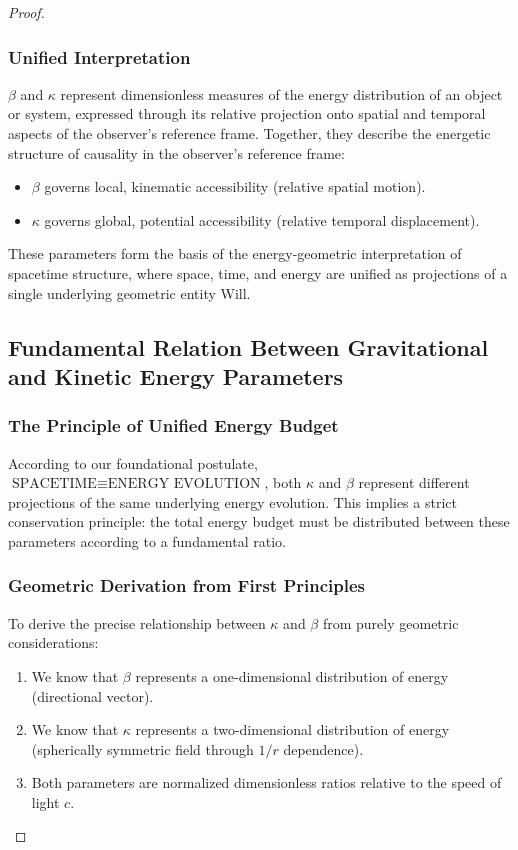 \documentclass{article}
\begin{document}
\begin{theorem}
\begin{proof}
\subsubsection{Unified Interpretation}
 \(\beta\) and \(\kappa\) represent dimensionless measures of the energy distribution of an object or system, expressed through its relative projection onto spatial and temporal aspects of the observer's reference frame.
Together, they describe the energetic structure of causality in the observer's reference frame:
\begin{itemize}
    \item \(\beta\) governs local, kinematic accessibility (relative spatial motion).
    \item \(\kappa\) governs global, potential accessibility (relative temporal displacement).
\end{itemize}
These parameters form the basis of the energy-geometric interpretation of spacetime structure, where space, time, and energy are unified as projections of a single underlying geometric entity Will.

\subsection{Fundamental Relation Between Gravitational and Kinetic Energy Parameters}

\subsubsection{The Principle of Unified Energy Budget}

According to our foundational postulate, $\text{SPACETIME} \equiv \text{ENERGY EVOLUTION}$, both $\kappa$ and $\beta$ represent different projections of the same underlying energy evolution. This implies a strict conservation principle: the total energy budget must be distributed between these parameters according to a fundamental ratio.

\subsubsection{Geometric Derivation from First Principles}

To derive the precise relationship between $\kappa$ and $\beta$ from purely geometric considerations:

\begin{enumerate}
    \item We know that $\beta$ represents a one-dimensional distribution of energy (directional vector).
    \item We know that $\kappa$ represents a two-dimensional distribution of energy (spherically symmetric field through $1/r$ dependence).
    \item Both parameters are normalized dimensionless ratios relative to the speed of light $c$.
\end{enumerate}


\end{proof}
\end{theorem}
\end{document}
